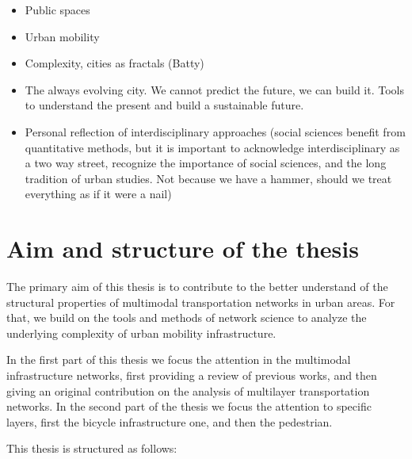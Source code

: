 \begin{itemize}
    \item Public spaces
    \item Urban mobility
    \item Complexity, cities as fractals (Batty)
    \item The always evolving city. We cannot predict the future, we can build it. Tools to understand the present and build a sustainable future.
    \item Personal reflection of interdisciplinary approaches (social sciences benefit from quantitative methods, but it is important to acknowledge interdisciplinary as a two way street, recognize the importance of social sciences, and the long tradition of urban studies. Not because we have a hammer, should we treat everything as if it were a nail) 
\end{itemize}


\section{Aim and structure of the thesis}


The primary aim of this thesis is to contribute to the better understand of the structural properties of multimodal transportation networks in urban areas. For that, we build on the tools and methods of network science to analyze the underlying complexity of urban mobility infrastructure. 

In the first part of this thesis we focus the attention in the multimodal infrastructure networks, first providing a review of previous works, and then giving an original contribution on the analysis of multilayer transportation networks. In the second part of the thesis we focus the attention to specific layers, first the bicycle infrastructure one, and then the pedestrian.

This thesis is structured as follows:

